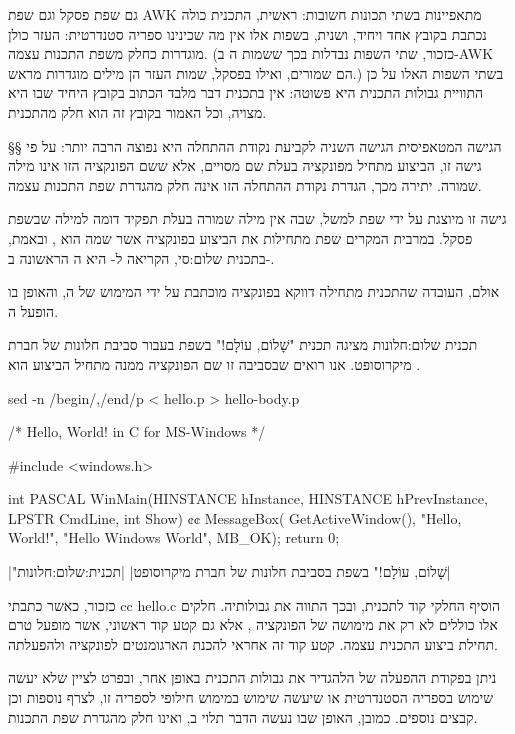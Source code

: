 גם שפת פסקל וגם שפת AWK מתאפיינות בשתי תכונות חשובות: ראשית, התכנית כולה נכתבת
בקובץ אחד ויחיד, ושנית, בשפות אלו אין מה שכינינו ספריה סטנדרטית:  העזר
כולן מוגדרות כחלק משפת התכנות עצמה. (כזכור, שתי השפות נבדלות בכך ששמות ה
ב-AWK הם  שמורים, ואילו בפסקל, שמות  העזר הן מילים מוגדרות מראש.)
בשתי השפות האלו על כן התוויית גבולות התכנית היא פשוטה: אין בתכנית דבר מלבד
הכתוב בקובץ היחיד שבו היא מצויה, וכל האמור בקובץ זה הוא חלק מהתכנית.

§§ הגישה המטאפיסית
הגישה השניה לקביעת נקודת ההתחלה היא נפוצה הרבה יותר: על פי גישה זו, הביצוע
מתחיל מפונקציה בעלת שם מסויים, אלא ששם הפונקציה הזו אינו מילה שמורה. יתירה
מכך, הגדרת נקודת ההתחלה הזו אינה חלק מהגדרת שפת התכנות עצמה.

גישה זו מיוצגת על ידי שפת  למשל, שבה אין מילה שמורה בעלת תפקיד דומה למילה
 שבשפת פסקל. במרבית המקרים שפת  מתחילות את הביצוע בפונקציה אשר
שמה הוא , ובאמת, ב תכנית שלום:סי, הקריאה ל- היא ה
הראשונה ב-.

אולם, העובדה שהתכנית מתחילה דווקא בפונקציה  מוכתבת על ידי המימוש של
ה, והאופן בו הופעל ה.

 תכנית שלום:חלונות מציגה תכנית "שָׁלוֹם, עוֹלָם!" בשפת  בעבור סביבת חלונות
של חברת מיקרוסופט. אנו רואים שבסביבה זו שם הפונקציה ממנה מתחיל הביצוע הוא
.

\bash
sed -n /begin/,/end/p < hello.p > hello-body.p
\END

\begin{תכנית}
\begin{CPPn}
  /* Hello, World! in C for MS-Windows */

  #include <windows.h>

  int PASCAL WinMain(HINSTANCE hInstance,
  HINSTANCE hPrevInstance, LPSTR CmdLine, int Show)
  {¢¢
    MessageBox(
    GetActiveWindow(),
    "Hello, World!",
    "Hello Windows World",
    MB_OK);
    return 0;
  }
\end{CPPn}
|"שָׁלוֹם, עוֹלָם!" בשפת  בסביבת חלונות של חברת מיקרוסופט|
|תכנית:שלום:חלונות|
\end{תכנית}

כזכור, כאשר כתבתי
cc hello.c
\END
הוסיף ה חלקי קוד לתכנית, ובכך התווה את גבולותיה. חלקים אלו כוללים לא
רק את מימושה של הפונקציה , אלא גם קטע קוד ראשוני, אשר מופעל טרם
תחילת ביצוע התכנית עצמה. קטע קוד זה אחראי להכנת הארגומנטים לפונקציה 
ולהפעלתה.

ניתן בפקודת ההפעלה של ה להגדיר את גבולות התכנית באופן אחר, ובפרט לציין
שלא יעשה שימוש בספריה הסטנדרטית או שיעשה שימוש במימוש חילופי לספריה זו, לצרף
 נוספות וכן קבצים נוספים. כמובן, האופן שבו נעשה הדבר תלוי ב, ואינו
חלק מהגדרת שפת התכנות.

